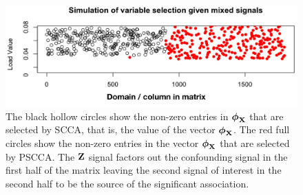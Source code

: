 \documentclass{llncs}
\newcommand{\X}{{\bf X}}
\newcommand{\Z}{{\bf Z}}
\newcommand{\bs}{\boldsymbol}
\begin{document}
\begin{figure}
\begin{center}
\includegraphics[width=120mm]{simulation_result_mix.pdf} 
\end{center}
\vspace{-0.2in}
\caption{The black hollow circles show the non-zero entries in
  $\bs\phi_{\X}$ that are selected by SCCA, that is, the value of the vector
  $\bs\phi_{\X}$.  The red full circles show the non-zero entries in
  the vector $\bs\phi_{\X}$ that are selected by PSCCA.  The $\Z$ signal factors
  out the confounding signal in the first half of the matrix leaving
  the second signal of interest in the second half to be the source of
the significant association.}
\label{fig:sim}
\end{figure}
\end{document}
